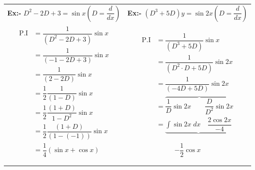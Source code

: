 \documentclass[a4paper, titlepage]{article}
\begin{document}
\begin{enumerate}[label=\textbf{\Roman*}]
            \begin{tabularx}{\linewidth}{X | c}
                \textbf{Ex:- } $D^2 - 2D + 3 = \sin x \left( D = \dfrac{d}{dx}\right)$
                &
                \textbf{Ex:- } $(D^3 + 5D)y = \sin 2x \left( D = \dfrac{d}{dx}\right)$ \\
                \begin{minipage}[c]{0.5\linewidth}
                    {
                        \begin{align*}
                            \text{P.I} &= \dfrac{1}{(D^2 - 2D + 3)} \sin x \\
                                       &= \dfrac{1}{(-1 -2D + 3)} \sin x \\
                                       &= \dfrac{1}{(2-2D)} \sin x \\
                                       &= \dfrac{1}{2} \dfrac{1}{(1-D)} \sin x \\
                                       &= \dfrac{1}{2} \dfrac{(1+D)}{1-D^2} \sin x \\
                                       &= \dfrac{1}{2} \dfrac{(1+D)}{(1-(-1))} \sin x \\
                                       &= \dfrac{1}{4}(\sin x + \cos x) \\
                        \end{align*}
                    }
                \end{minipage}
                &
                \begin{minipage}[c]{0.5\linewidth}
                    {
                        \begin{align*}
                            \text{P.I} &= \dfrac{1}{(D^3 + 5D)} \sin x \\
                                       &= \dfrac{1}{(D^2\cdot D + 5D)} \sin 2x \\
                                       &= \dfrac{1}{(-4D+5D)} \sin 2x \\
                                       &= \overbrace{ \dfrac{1}{D} \sin 2x \qquad \dfrac{D}{D^2} \sin 2x } \\
                                       &= \underbrace{\displaystyle\int \sin 2x \; dx \quad \dfrac{2\cos 2x}{-4}}
                        \end{align*}
                    }
                    \begin{center}
                        $-\dfrac{1}{2} \cos x$
                    \end{center}
                \end{minipage}
            \end{tabularx}


\end{enumerate}
\end{document}
